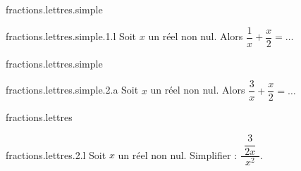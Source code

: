 \begin{qcm}{fractions.lettres.simple}
    \begin{question}{fractions.lettres.simple.1.l}
         Soit \(x\) un réel non nul. Alors \( \dfrac{1}{x}+\dfrac{x}{2}=\ldots\)
         \begin{multicols}{2}
            \begin{reponses}
         \end{reponses}
         \end{multicols}
    \end{question}
\end{qcm}


\begin{qcm}{fractions.lettres.simple}
    \begin{question}{fractions.lettres.simple.2.a}
         Soit \(x\) un réel non nul. Alors \( \dfrac{3}{x}+\dfrac{x}{2}=\ldots\)
         \begin{multicols}{2}
            \begin{reponses}
         \end{reponses}
         \end{multicols}
    \end{question}
\end{qcm}



\begin{qcm}{fractions.lettres}
\begin{question}{fractions.lettres.2.l}
      Soit \(x\) un réel non nul. Simplifier : \( \dfrac{\dfrac{3}{2x}}{~~x^2~~}\).
         \begin{multicols}{3}
            \begin{reponses}
         \end{reponses}
         \end{multicols}
    \end{question}
\end{qcm}

